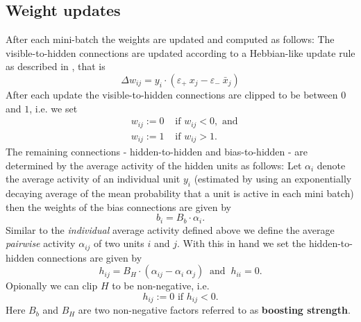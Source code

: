 \documentclass[titlepage]{amsart}
\theoremstyle{definition}
\begin{document}
\subsection{Weight updates}
% 
% 
After each mini-batch the weights are updated and computed as follows:
The visible-to-hidden connections are updated according to a Hebbian-like update rule 
as described in \cite{sp_paper}, that is
$$
\Delta w_{ij} = y_i \cdot  ( \varepsilon_+ \ x_j - \varepsilon_- \ \bar x_j ) 
$$
After each update the visible-to-hidden connections
are clipped to be between $0$ and $1$, i.e. we set
\begin{eqnarray*}
   &w_{ij} := 0& \text{ if } w_{ij} < 0 , \text{ and} \\
   &w_{ij} := 1& \text{ if } w_{ij} > 1.
\end{eqnarray*}
The remaining connections - hidden-to-hidden and bias-to-hidden - 
are determined by the average activity of the hidden units as follows:
Let $\alpha_i$ denote the average activity of an individual unit $y_i$
(estimated by using an exponentially decaying average of the mean probability 
that a unit is active in each mini batch) then the weights of the bias 
connections are given by
$$
  b_{i}  = B_b \cdot \alpha_i.
$$
Similar to the \textit{individual} average activity defined above we define 
the average \textit{pairwise} activity $\alpha_{ij}$ of two units $i$ and $j$.
With this in hand we set the hidden-to-hidden connections are given by
$$
  h_{ij} = B_H \cdot ( \alpha_{ij} - \alpha_i \ \alpha_j ) \ \text{ and } \  h_{ii} = 0.
$$
Opionally we can clip $H$ to be non-negative, i.e.
$$
  h_{ij} := 0 \text{ if } h_{ij} < 0.
$$
Here $B_b$ and $B_H$ are two non-negative factors referred to as \textbf{boosting strength}.
% 
% 
\end{document}
